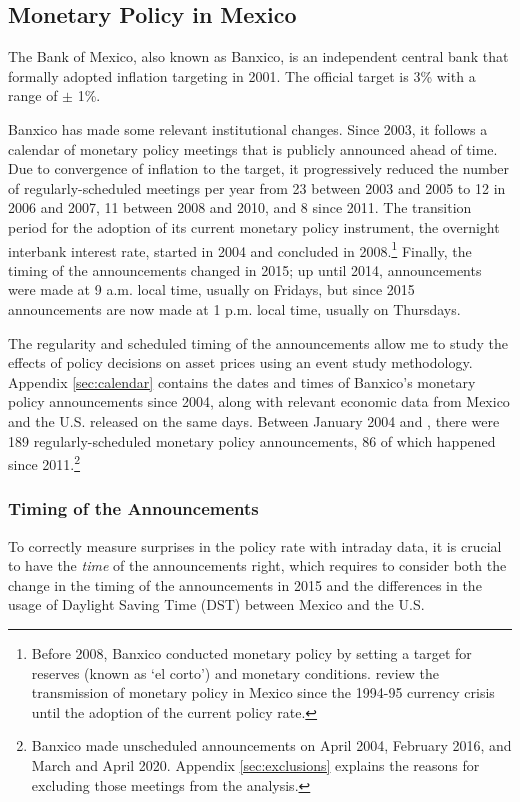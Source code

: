 \documentclass[a4paper,12pt]{article} 		%
\begin{document}
\sectitlespace
\subsection{Monetary Policy in Mexico}
\sectitlespace
The Bank of Mexico, also known as Banxico, is an independent central bank that formally adopted inflation targeting in 2001. The official target is 3\% with a range of \(\pm\) 1\%. 

Banxico has made some relevant institutional changes. Since 2003, it follows a calendar of monetary policy meetings that is publicly announced ahead of time. Due to convergence of inflation to the target, it progressively reduced the number of regularly-scheduled meetings per year from 23 between 2003 and 2005 to 12 in 2006 and 2007, 11 between 2008 and 2010, and 8 since 2011. The transition period for the adoption of its current monetary policy instrument, the overnight interbank interest rate, started in 2004 and concluded in 2008.\footnote{Before 2008, Banxico conducted monetary policy by setting a target for reserves (known as `el corto') and monetary conditions. \textcite{SidaouiRF:2008} review the transmission of monetary policy in Mexico since the 1994-95 currency crisis until the adoption of the current policy rate.} Finally, the timing of the announcements changed in 2015; up until 2014, announcements were made at 9 a.m. local time, usually on Fridays, but since 2015 announcements are now made at 1 p.m. local time, usually on Thursdays. 

The regularity and scheduled timing of the announcements allow me to study the effects of policy decisions on asset prices using an event study methodology. Appendix \ref{sec:calendar} contains the dates and times of Banxico's monetary policy announcements since 2004, along with relevant economic data from Mexico and the U.S. released on the same days. Between January 2004 and \lastobsfx, there were 189 regularly-scheduled monetary policy announcements, 86 of which happened since 2011.\footnote{Banxico made unscheduled announcements on April 2004, February 2016, and March and April 2020. Appendix \ref{sec:exclusions} explains the reasons for excluding those meetings from the analysis.} 

\sectitlespace
\subsubsection{Timing of the Announcements} \label{sec:mptiming}
\sectitlespace

To correctly measure surprises in the policy rate with intraday data, it is crucial to have the \textit{time} of the announcements right, which requires to consider both the change in the timing of the announcements in 2015 and the differences in the usage of Daylight Saving Time (DST) between Mexico and the U.S.
\end{document}
